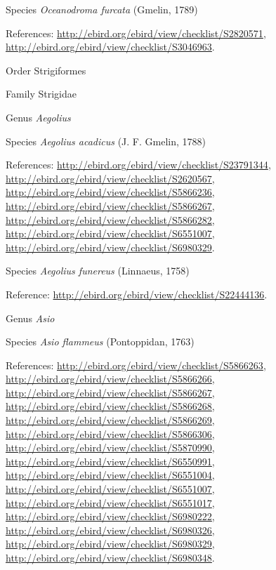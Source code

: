 \documentclass[9pt, article]{memoir}
\begin{document}
\begin{multicols}{2}
\vspace{6pt}\noindent\hspace{36pt}Species \textit{Oceanodroma furcata} (Gmelin, 1789)


\vspace{6pt}References: 
\url{http://ebird.org/ebird/view/checklist/S2820571}, 
\url{http://ebird.org/ebird/view/checklist/S3046963}.

\vspace{6pt}\noindent\hspace{18pt}Order Strigiformes


\vspace{6pt}\noindent\hspace{24pt}Family Strigidae


\vspace{6pt}\noindent\hspace{30pt}Genus \textit{Aegolius}


\vspace{6pt}\noindent\hspace{36pt}Species \textit{Aegolius acadicus} (J. F. Gmelin, 1788)


\vspace{6pt}References: 
\url{http://ebird.org/ebird/view/checklist/S23791344}, 
\url{http://ebird.org/ebird/view/checklist/S2620567}, 
\url{http://ebird.org/ebird/view/checklist/S5866236}, 
\url{http://ebird.org/ebird/view/checklist/S5866267}, 
\url{http://ebird.org/ebird/view/checklist/S5866282}, 
\url{http://ebird.org/ebird/view/checklist/S6551007}, 
\url{http://ebird.org/ebird/view/checklist/S6980329}.

\vspace{6pt}\noindent\hspace{36pt}Species \textit{Aegolius funereus} (Linnaeus, 1758)


\vspace{6pt}Reference: 
\url{http://ebird.org/ebird/view/checklist/S22444136}.

\vspace{6pt}\noindent\hspace{30pt}Genus \textit{Asio}


\vspace{6pt}\noindent\hspace{36pt}Species \textit{Asio flammeus} (Pontoppidan, 1763)


\vspace{6pt}References: 
\url{http://ebird.org/ebird/view/checklist/S5866263}, 
\url{http://ebird.org/ebird/view/checklist/S5866266}, 
\url{http://ebird.org/ebird/view/checklist/S5866267}, 
\url{http://ebird.org/ebird/view/checklist/S5866268}, 
\url{http://ebird.org/ebird/view/checklist/S5866269}, 
\url{http://ebird.org/ebird/view/checklist/S5866306}, 
\url{http://ebird.org/ebird/view/checklist/S5870990}, 
\url{http://ebird.org/ebird/view/checklist/S6550991}, 
\url{http://ebird.org/ebird/view/checklist/S6551004}, 
\url{http://ebird.org/ebird/view/checklist/S6551007}, 
\url{http://ebird.org/ebird/view/checklist/S6551017}, 
\url{http://ebird.org/ebird/view/checklist/S6980222}, 
\url{http://ebird.org/ebird/view/checklist/S6980326}, 
\url{http://ebird.org/ebird/view/checklist/S6980329}, 
\url{http://ebird.org/ebird/view/checklist/S6980348}.


\end{multicols}
\end{document}
